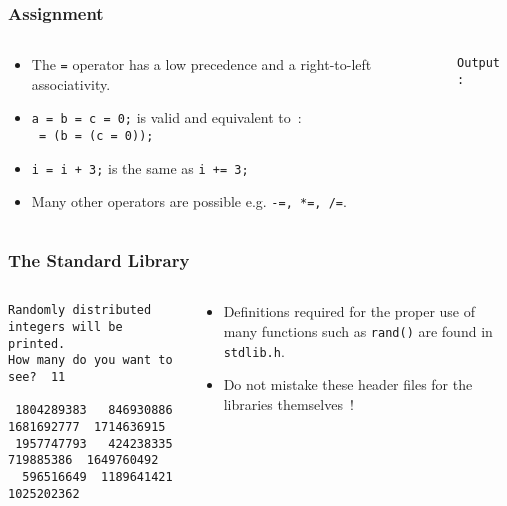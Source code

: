 \begin{frame}[fragile]
\frametitle{Assignment}

\begin{columns}
\begin{column}{0.5\textwidth}
\begin{itemize}[<+->]
\item The \verb$=$ operator has a low precedence
and a right-to-left associativity.
\item  \verb$a = b = c = 0;$ is valid and equivalent to~:\\
\verb$ = (b = (c = 0));$
\item  \verb$i = i + 3;$ is the same as \verb$i += 3;$
\item  Many other operators are possible e.g. \verb$-=, *=, /=$.
\end{itemize}
\end{column}

\begin{column}{0.5\textwidth}

{\scriptsize{\tt Output :}}
\end{column}

\end{columns}
\end{frame}

\begin{frame}[fragile]
\frametitle{The Standard Library}
\begin{columns}

\begin{column}{0.65\textwidth}

\vspace*{-1em}
{\tiny
\begin{verbatim}
Randomly distributed integers will be printed.
How many do you want to see?  11

 1804289383   846930886  1681692777  1714636915
 1957747793   424238335   719885386  1649760492
  596516649  1189641421  1025202362
\end{verbatim}
}
\end{column}

\begin{column}{0.35\textwidth}
\begin{itemize}[<+->]
\item Definitions required for the proper use of
many functions such as \verb^rand()^
are found in \verb^stdlib.h^.
\item  Do not mistake these header files for the libraries
themselves~!
\end{itemize}
\end{column}

\end{columns}
\end{frame}

